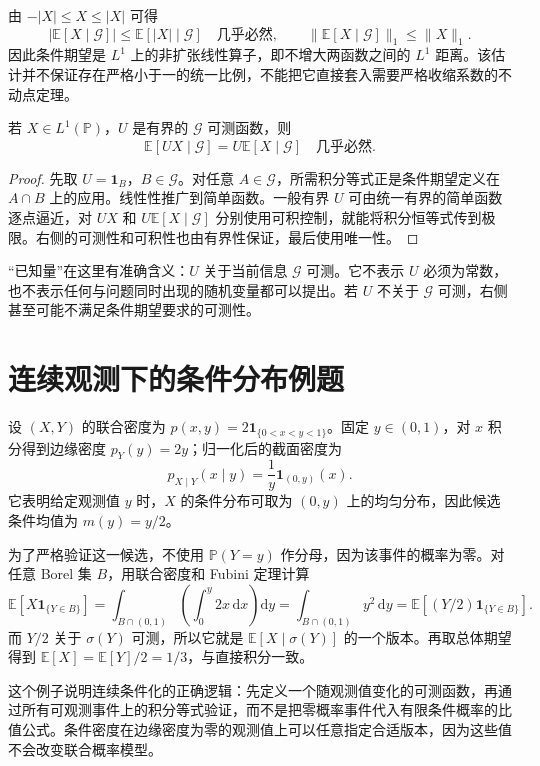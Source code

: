 由 $-|X|\leq X\leq|X|$ 可得
\[
 |\mathbb E[X\mid\mathcal G]|
 \leq\mathbb E[|X|\mid\mathcal G]\quad\text{几乎必然},
 \qquad
 \|\mathbb E[X\mid\mathcal G]\|_1\leq\|X\|_1.
\]
因此条件期望是 $L^1$ 上的非扩张线性算子，即不增大两函数之间的 $L^1$ 距离。该估计并不保证存在严格小于一的统一比例，不能把它直接套入需要严格收缩系数的不动点定理。

\begin{proposition}[提出已知量的有界版本]
若 $X\in L^1(\mathbb P)$，$U$ 是有界的 $\mathcal G$ 可测函数，则
\[
 \mathbb E[UX\mid\mathcal G]=U\mathbb E[X\mid\mathcal G]
 \quad\text{几乎必然}.
\]
\end{proposition}
\begin{proof}
先取 $U=\mathbf1_B$，$B\in\mathcal G$。对任意 $A\in\mathcal G$，所需积分等式正是条件期望定义在 $A\cap B$ 上的应用。线性性推广到简单函数。一般有界 $U$ 可由统一有界的简单函数逐点逼近，对 $UX$ 和 $U\mathbb E[X\mid\mathcal G]$ 分别使用可积控制，就能将积分恒等式传到极限。右侧的可测性和可积性也由有界性保证，最后使用唯一性。
\end{proof}
“已知量”在这里有准确含义：$U$ 关于当前信息 $\mathcal G$ 可测。它不表示 $U$ 必须为常数，也不表示任何与问题同时出现的随机变量都可以提出。若 $U$ 不关于 $\mathcal G$ 可测，右侧甚至可能不满足条件期望要求的可测性。

\section{连续观测下的条件分布例题}
\begin{example}[三角形区域上的联合密度]
设 $(X,Y)$ 的联合密度为 $p(x,y)=2\mathbf1_{\{0<x<y<1\}}$。固定 $y\in(0,1)$，对 $x$ 积分得到边缘密度 $p_Y(y)=2y$；归一化后的截面密度为
\[
 p_{X\mid Y}(x\mid y)=\frac1y\mathbf1_{(0,y)}(x).
\]
它表明给定观测值 $y$ 时，$X$ 的条件分布可取为 $(0,y)$ 上的均匀分布，因此候选条件均值为 $m(y)=y/2$。
\end{example}
为了严格验证这一候选，不使用 $\mathbb P(Y=y)$ 作分母，因为该事件的概率为零。对任意 Borel 集 $B$，用联合密度和 Fubini 定理计算
\[
 \mathbb E[X\mathbf1_{\{Y\in B\}}]
 =\int_{B\cap(0,1)}\left(\int_0^y2x\,\mathrm dx\right)\mathrm dy
 =\int_{B\cap(0,1)}y^2\,\mathrm dy
 =\mathbb E[(Y/2)\mathbf1_{\{Y\in B\}}].
\]
而 $Y/2$ 关于 $\sigma(Y)$ 可测，所以它就是 $\mathbb E[X\mid\sigma(Y)]$ 的一个版本。再取总体期望得到 $\mathbb E[X]=\mathbb E[Y]/2=1/3$，与直接积分一致。

这个例子说明连续条件化的正确逻辑：先定义一个随观测值变化的可测函数，再通过所有可观测事件上的积分等式验证，而不是把零概率事件代入有限条件概率的比值公式。条件密度在边缘密度为零的观测值上可以任意指定合适版本，因为这些值不会改变联合概率模型。


